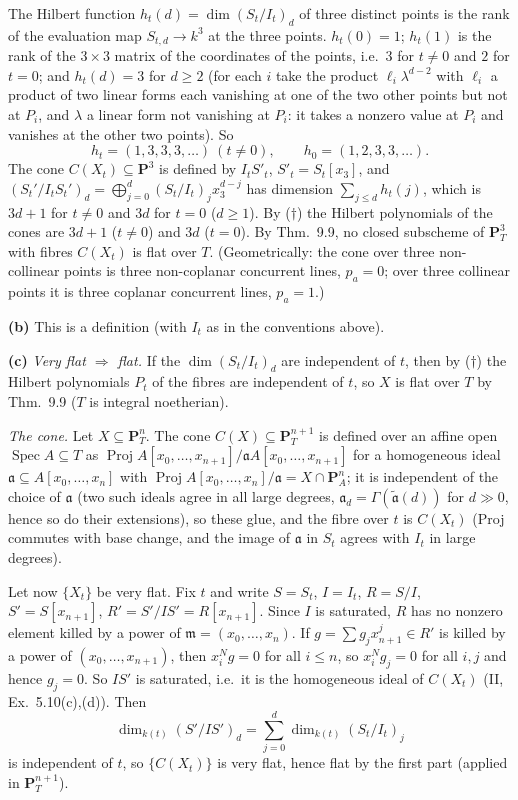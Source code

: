 \documentclass[11pt]{article}
\begin{document}
The Hilbert function $h_t(d)=\dim(S_t/I_t)_d$ of three distinct points is the rank of the evaluation map $S_{t,d}\to k^3$ at the three points. $h_t(0)=1$; $h_t(1)$ is the rank of the $3\times3$ matrix of the coordinates of the points, i.e.\ $3$ for $t\ne0$ and $2$ for $t=0$; and $h_t(d)=3$ for $d\ge2$ (for each $i$ take the product $\ell_i\lambda^{d-2}$ with $\ell_i$ a product of two linear forms each vanishing at one of the two other points but not at $P_i$, and $\lambda$ a linear form not vanishing at $P_i$: it takes a nonzero value at $P_i$ and vanishes at the other two points). So
\[
h_t=(1,3,3,3,\dots)\ (t\ne0),\qquad h_0=(1,2,3,3,\dots).
\]
The cone $C(X_t)\subseteq\mathbf P^3$ is defined by $I_tS'_t$, $S'_t=S_t[x_3]$, and $(S_t'/I_tS_t')_d=\bigoplus_{j=0}^d(S_t/I_t)_jx_3^{d-j}$ has dimension $\sum_{j\le d}h_t(j)$, which is $3d+1$ for $t\ne0$ and $3d$ for $t=0$ ($d\ge1$). By ($\dagger$) the Hilbert polynomials of the cones are $3d+1$ ($t\ne0$) and $3d$ ($t=0$). By Thm.~9.9, no closed subscheme of $\mathbf P^3_T$ with fibres $C(X_t)$ is flat over $T$. (Geometrically: the cone over three non-collinear points is three non-coplanar concurrent lines, $p_a=0$; over three collinear points it is three coplanar concurrent lines, $p_a=1$.)

\textbf{(b)} This is a definition (with $I_t$ as in the conventions above).

\textbf{(c)} \emph{Very flat $\Rightarrow$ flat.} If the $\dim(S_t/I_t)_d$ are independent of $t$, then by ($\dagger$) the Hilbert polynomials $P_t$ of the fibres are independent of $t$, so $X$ is flat over $T$ by Thm.~9.9 ($T$ is integral noetherian).

\emph{The cone.} Let $X\subseteq\mathbf P^n_T$. The cone $C(X)\subseteq\mathbf P^{n+1}_T$ is defined over an affine open $\operatorname{Spec}A\subseteq T$ as $\operatorname{Proj}A[x_0,\dots,x_{n+1}]/\mathfrak aA[x_0,\dots,x_{n+1}]$ for a homogeneous ideal $\mathfrak a\subseteq A[x_0,\dots,x_n]$ with $\operatorname{Proj}A[x_0,\dots,x_n]/\mathfrak a=X\cap\mathbf P^n_{A}$; it is independent of the choice of $\mathfrak a$ (two such ideals agree in all large degrees, $\mathfrak a_d=\Gamma(\tilde{\mathfrak a}(d))$ for $d\gg0$, hence so do their extensions), so these glue, and the fibre over $t$ is $C(X_t)$ (Proj commutes with base change, and the image of $\mathfrak a$ in $S_t$ agrees with $I_t$ in large degrees).

Let now $\{X_t\}$ be very flat. Fix $t$ and write $S=S_t$, $I=I_t$, $R=S/I$, $S'=S[x_{n+1}]$, $R'=S'/IS'=R[x_{n+1}]$. Since $I$ is saturated, $R$ has no nonzero element killed by a power of $\mathfrak m=(x_0,\dots,x_n)$. If $g=\sum g_jx_{n+1}^j\in R'$ is killed by a power of $(x_0,\dots,x_{n+1})$, then $x_i^Ng=0$ for all $i\le n$, so $x_i^Ng_j=0$ for all $i,j$ and hence $g_j=0$. So $IS'$ is saturated, i.e.\ it is the homogeneous ideal of $C(X_t)$ (II, Ex.~5.10(c),(d)). Then
\[
\dim_{k(t)}(S'/IS')_d=\sum_{j=0}^d\dim_{k(t)}(S_t/I_t)_j
\]
is independent of $t$, so $\{C(X_t)\}$ is very flat, hence flat by the first part (applied in $\mathbf P^{n+1}_T$).
\end{document}
